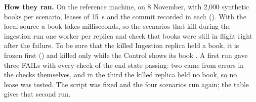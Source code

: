 \textbf{How they ran.} On the reference machine, on 8 November, with 2,000 synthetic books per scenario, leases of
15~s and the commit recorded in each  (). With the local source a book takes
milliseconds, so the scenarios that kill during the ingestion run one worker per replica and check that books were still
in flight right after the failure. To be sure that the killed Ingestion replica held a book, it is frozen first
() and killed only while the Control shows its book . A first run gave three FAILs
with every check of the end state passing: two came from errors in the checks themselves, and in the third the killed
replica held no book, so no lease was tested. The script was fixed and the four scenarios run again; the table gives
that second run.
